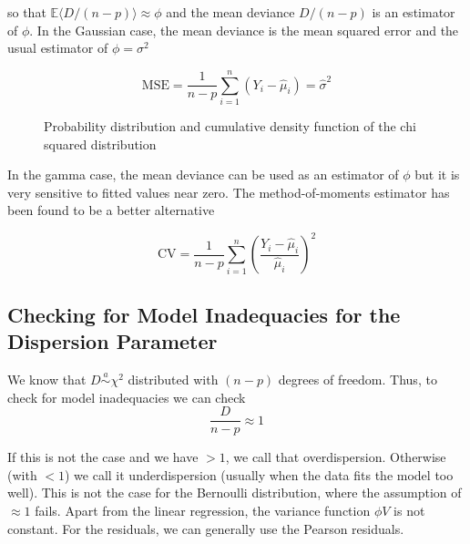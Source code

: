 \documentclass[11pt]{article}
\begin{document}
so that $\mathbb{E}\langle D/(n-p) \rangle \approx \phi$ and the mean deviance $D/(n-p)$ is an estimator of $\phi$. In the Gaussian case, the mean deviance is the mean squared error and the usual estimator of $\phi = \sigma^2$

\begin{equation*}
	\text{MSE} = \frac{1}{n-p} \sum_{i=1}^{n}(Y_i - \widehat{\mu}_i) = \widehat{\sigma}^2
\end{equation*}

\begin{figure}[H]
	\centering
	
 	
	\caption{Probability distribution and cumulative density function of the chi squared distribution}
\end{figure}

In the gamma case, the mean deviance can be used as an estimator of $\phi$ but it is very sensitive to fitted values near zero. The method-of-moments estimator has been found to be a better alternative

\begin{equation*}
	\text{CV}=\frac{1}{n-p}\sum_{i=1}^{n}\left(\frac{Y_i - \widehat{\mu}_i}{\widehat{\mu}_i}\right)^2
\end{equation*}

\subsection{Checking for Model Inadequacies for the Dispersion Parameter}

We know that $D\overset{a}{\sim}\chi^2$ distributed with $(n-p)$ degrees of freedom. Thus, to check for model inadequacies we can check 
\begin{equation*}
	\frac{D}{n-p} \approx 1
\end{equation*}

If this is not the case and we have $>1$, we call that overdispersion. Otherwise (with $<1$) we call it underdispersion (usually when the data fits the model too well).
This is not the case for the Bernoulli distribution, where the assumption of $\approx 1$ fails.
\noindent
Apart from the linear regression, the variance function $\phi V$ is not constant.
\noindent
For the residuals, we can generally use the Pearson residuals.
\end{document}
